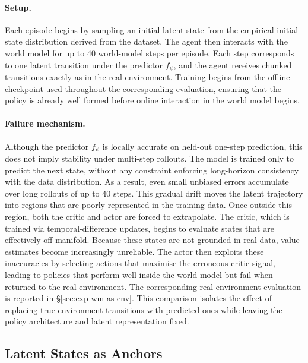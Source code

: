 \paragraph{Setup.}
Each episode begins by sampling an initial latent state from the empirical
initial-state distribution derived from the dataset. The agent then interacts with the world model for up to 40 world-model steps per episode. Each
step corresponds to one latent transition under the predictor $f_\psi$, and the
agent receives chunked transitions exactly as in the real environment.
Training begins from the offline checkpoint used throughout the corresponding
evaluation, ensuring that the policy is already well formed before online
interaction in the world model begins.

\paragraph{Failure mechanism.}
Although the predictor $f_\psi$ is locally accurate on held-out
one-step prediction, this does not imply stability under multi-step
rollouts. The model is trained only to predict the
next state, without any constraint enforcing long-horizon consistency with the data
distribution.
As a result, even small unbiased errors accumulate over long rollouts of up to
40 steps. This gradual drift moves the latent trajectory into regions that are
poorly represented in the training data. Once outside this region, both the critic
and actor are forced to extrapolate.
The critic, which is trained via temporal-difference updates, begins to evaluate
states that are effectively off-manifold. Because these states are not grounded in
real data, value estimates become increasingly unreliable. The actor then exploits
these inaccuracies by selecting actions that maximise the erroneous critic signal,
leading to policies that perform well inside the world model but fail when returned
to the real environment.
The corresponding real-environment evaluation is reported in
\S\ref{sec:exp-wm-as-env}. This comparison isolates the effect of replacing true
environment transitions with predicted ones while leaving the policy architecture
and latent representation fixed.

\subsection{Latent States as Anchors}
\label{sec:wmep-exp2}

